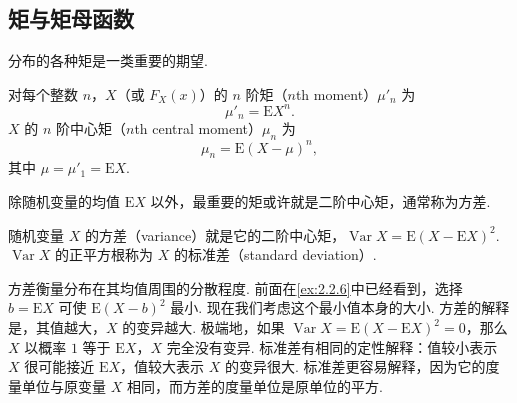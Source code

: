\subsection{矩与矩母函数}\label{sec:2.3}
分布的各种矩是一类重要的期望.
\begin{definition}\label{def:2.3.1}
对每个整数 $n$，$X$（或 $F_X(x)$）的 $n$ 阶矩（$n$th moment）$\mu'_n$ 为
$$\mu'_n=\mathrm EX^n.$$
$X$ 的 $n$ 阶中心矩（$n$th central moment）$\mu_n$ 为
$$\mu_n=\mathrm E(X-\mu)^n,$$
其中 $\mu=\mu'_1=\mathrm EX$.
\end{definition}
除随机变量的均值 $\mathrm EX$ 以外，最重要的矩或许就是二阶中心矩，通常称为方差.
\begin{definition}\label{def:2.3.2}
随机变量 $X$ 的方差（variance）就是它的二阶中心矩，$\operatorname{Var}X=\mathrm E(X-\mathrm EX)^2$. $\operatorname{Var}X$ 的正平方根称为 $X$ 的标准差（standard deviation）.
\end{definition}
方差衡量分布在其均值周围的分散程度. 前面在\autoref{ex:2.2.6}中已经看到，选择 $b=\mathrm EX$ 可使 $\mathrm E(X-b)^2$ 最小. 现在我们考虑这个最小值本身的大小. 方差的解释是，其值越大，$X$ 的变异越大. 极端地，如果 $\operatorname{Var}X=\mathrm E(X-\mathrm EX)^2=0$，那么 $X$ 以概率 $1$ 等于 $\mathrm EX$，$X$ 完全没有变异. 标准差有相同的定性解释：值较小表示 $X$ 很可能接近 $\mathrm EX$，值较大表示 $X$ 的变异很大. 标准差更容易解释，因为它的度量单位与原变量 $X$ 相同，而方差的度量单位是原单位的平方.

